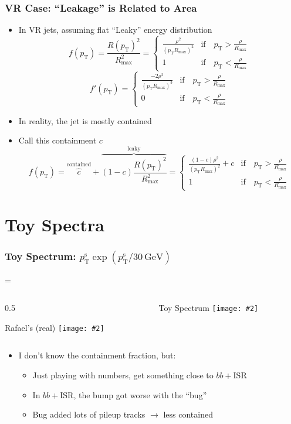 \documentclass[xcolor={table}]{beamer}
\newcommand{\pt}{p_{\mathrm{T}}}
\newcommand{\ptr}{\pt}
\newcommand{\ptt}{\pt^{\text{s}}}
\newcommand{\graphic}[2][0.99]{\texttt{[image: \#2]}}
\newcommand{\twocol}[3][0.5]{
  \newdimen\scwid
  \scwid=\dimexpr\textwidth-#1\textwidth\relax
  \begin{columns}
    \begin{column}{#1\textwidth}#2\end{column}
      \begin{column}{\scwid}#3\end{column}
  \end{columns}
}
\begin{document}
\begin{frame}
  \frametitle{VR Case: ``Leakage'' is Related to Area}
  \begin{itemize}
  \item In VR jets, assuming flat ``Leaky'' energy distribution
    \[ f(\ptr) = \frac{R(\ptr)^{2}}{R^{2}_{\text{max}}} = \begin{cases}
      \frac{ \rho^2 }{(\ptr R_{\text{max}})^2}  &\text{if}\quad \ptr > \frac{\rho}{R_{\text{max}}}\\
       1 &\text{if}\quad  \ptr <  \frac{\rho}{R_{\text{max}}}
    \end{cases}
      \]
    \[ f'(\ptr) = \begin{cases}
      \frac{-2 \rho^2 }{(\ptr R_{\text{max}})^3}  &\text{if}\quad \ptr > \frac{\rho}{R_{\text{max}}}\\
      0 &\text{if}\quad  \ptr <  \frac{\rho}{R_{\text{max}}}
    \end{cases}
    \]
  \item In reality, the jet is mostly contained
  \item Call this containment $c$
    \[ f(\ptr) = \overbrace{c}^{\text{contained}} + \overbrace{(1-c) \frac{R(\ptr)^{2}}{R^{2}_{\text{max}}}}^{\text{leaky}} = \begin{cases}
      \frac{ (1-c) \rho^2 }{(\ptr R_{\text{max}})^2} + c  &
      \text{if}\quad \ptr > \frac{\rho}{R_{\text{max}}} \\
      1 & \text{if}\quad  \ptr <  \frac{\rho}{R_{\text{max}}}
    \end{cases}
      \]
  \end{itemize}
\end{frame}

\section{Toy Spectra}

\begin{frame}
  \frametitle{Toy Spectrum: $\ptt \exp(\ptt / 30\, \text{GeV})$}
  \twocol{
    \begin{center}
      Rafael's (real)
      \graphic{trkjet1_pt.png}
    \end{center}
  }{
    \begin{center}
      Toy Spectrum
      \graphic{{spec.pdf}}
    \end{center}
  }
  \begin{itemize}
  \item I don't know the containment fraction, but:
    \begin{itemize}
    \item Just playing with numbers, get something close to $bb + \text{ISR}$
    \item In $bb + \text{ISR}$, the bump got worse with the ``bug''
    \item Bug added lots of pileup tracks $\to$ less contained
    \end{itemize}
  \end{itemize}
\end{frame}
\end{document}
